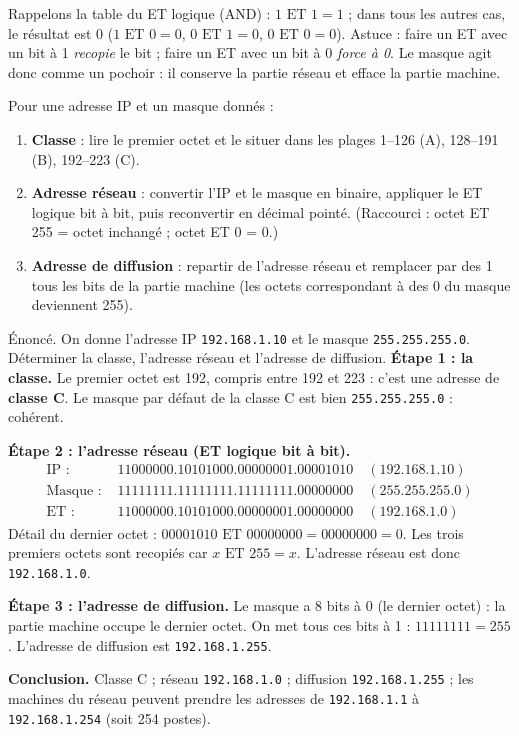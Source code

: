 \documentclass[11pt]{article}
\newcommand{\cle}[1]{{\popxbold\color{popdark}#1}}
\begin{document}
Rappelons la table du \cle{ET logique} (AND) : $1 \text{ ET } 1 = 1$ ; dans tous les autres cas, le résultat est 0 ($1 \text{ ET } 0 = 0$, $0 \text{ ET } 1 = 0$, $0 \text{ ET } 0 = 0$). Astuce : faire un ET avec un bit à 1 \emph{recopie} le bit ; faire un ET avec un bit à 0 \emph{force à 0}. Le masque agit donc comme un pochoir : il conserve la partie réseau et efface la partie machine.

\begin{methode}
Pour une adresse IP et un masque donnés :
\begin{enumerate}
  \item \textbf{Classe} : lire le premier octet et le situer dans les plages 1--126 (A), 128--191 (B), 192--223 (C).
  \item \textbf{Adresse réseau} : convertir l'IP et le masque en binaire, appliquer le ET logique bit à bit, puis reconvertir en décimal pointé. (Raccourci : octet ET 255 = octet inchangé ; octet ET 0 = 0.)
  \item \textbf{Adresse de diffusion} : repartir de l'adresse réseau et remplacer par des 1 tous les bits de la partie machine (les octets correspondant à des 0 du masque deviennent 255).
\end{enumerate}
\end{methode}

\begin{exoresolu}
Énoncé. On donne l'adresse IP \texttt{192.168.1.10} et le masque \texttt{255.255.255.0}. Déterminer la classe, l'adresse réseau et l'adresse de diffusion.
\tcblower
\textbf{Étape 1 : la classe.} Le premier octet est 192, compris entre 192 et 223 : c'est une adresse de \textbf{classe C}. Le masque par défaut de la classe C est bien \texttt{255.255.255.0} : cohérent.

\textbf{Étape 2 : l'adresse réseau (ET logique bit à bit).}
\begin{align*}
\text{IP : }     & 11000000.10101000.00000001.00001010 \quad (192.168.1.10)\\
\text{Masque : } & 11111111.11111111.11111111.00000000 \quad (255.255.255.0)\\
\text{ET : }     & 11000000.10101000.00000001.00000000 \quad (192.168.1.0)
\end{align*}
Détail du dernier octet : $00001010 \text{ ET } 00000000 = 00000000 = 0$. Les trois premiers octets sont recopiés car $x \text{ ET } 255 = x$.
L'adresse réseau est donc \texttt{192.168.1.0}.

\textbf{Étape 3 : l'adresse de diffusion.} Le masque a 8 bits à 0 (le dernier octet) : la partie machine occupe le dernier octet. On met tous ces bits à 1 : $11111111 = 255$. L'adresse de diffusion est \texttt{192.168.1.255}.

\textbf{Conclusion.} Classe C ; réseau \texttt{192.168.1.0} ; diffusion \texttt{192.168.1.255} ; les machines du réseau peuvent prendre les adresses de \texttt{192.168.1.1} à \texttt{192.168.1.254} (soit 254 postes).
\end{exoresolu}
\end{document}

